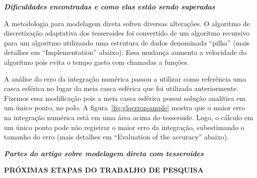 \documentclass[12pt,a4paper]{article}
\begin{document}
\bigskip

{\centering\bfseries\itshape
Dificuldades encontradas e como elas estão sendo superadas
\par}

\bigskip

A metodologia para modelagem direta sofreu diversas alterações.
O algoritmo de discretização adaptativa dos tesseroides foi convertido de um
algoritmo recursivo para um algoritmo utilizando uma estrutura de dados
denominada ``pilha'' (mais detalhes em ``Implementation'' abaixo).
Essa mudança aumenta a velocidade do algoritmo pois evita o tempo gasto com
chamadas a funções.

A análise do erro da integração numérica passou a utilizar como referência uma
casca esférica no lugar da meia casca esférica que foi utilizada anteriormente.
Fizemos essa modificação pois a meia casca  esférica possui solução
analítica em um único ponto, no polo.
A figura~\ref{fig:glqerrorsample} mostra que o  maior erro na integração
numérica está em uma área acima  do tesseroide.
Logo, o cálculo em um único ponto  pode não  registrar o maior erro da
integração, subestimando o tamanho do erro
(mais detalhes em ``Evaluation of the accuracy'' abaixo).

\bigskip
\bigskip

{\centering\bfseries\itshape
Partes do artigo sobre modelagem direta com tesseroides
\par}







\newpage

\begin{center}
\textbf{\large PRÓXIMAS ETAPAS DO TRABALHO DE PESQUISA}
\end{center}

\vspace{0.5cm}
\end{document}
